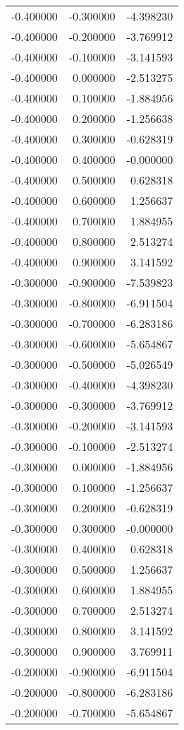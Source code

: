 \begin{tabular}{rrr}
-0.400000 & -0.300000 & -4.398230 \\
-0.400000 & -0.200000 & -3.769912 \\
-0.400000 & -0.100000 & -3.141593 \\
-0.400000 & 0.000000 & -2.513275 \\
-0.400000 & 0.100000 & -1.884956 \\
-0.400000 & 0.200000 & -1.256638 \\
-0.400000 & 0.300000 & -0.628319 \\
-0.400000 & 0.400000 & -0.000000 \\
-0.400000 & 0.500000 & 0.628318 \\
-0.400000 & 0.600000 & 1.256637 \\
-0.400000 & 0.700000 & 1.884955 \\
-0.400000 & 0.800000 & 2.513274 \\
-0.400000 & 0.900000 & 3.141592 \\
-0.300000 & -0.900000 & -7.539823 \\
-0.300000 & -0.800000 & -6.911504 \\
-0.300000 & -0.700000 & -6.283186 \\
-0.300000 & -0.600000 & -5.654867 \\
-0.300000 & -0.500000 & -5.026549 \\
-0.300000 & -0.400000 & -4.398230 \\
-0.300000 & -0.300000 & -3.769912 \\
-0.300000 & -0.200000 & -3.141593 \\
-0.300000 & -0.100000 & -2.513274 \\
-0.300000 & 0.000000 & -1.884956 \\
-0.300000 & 0.100000 & -1.256637 \\
-0.300000 & 0.200000 & -0.628319 \\
-0.300000 & 0.300000 & -0.000000 \\
-0.300000 & 0.400000 & 0.628318 \\
-0.300000 & 0.500000 & 1.256637 \\
-0.300000 & 0.600000 & 1.884955 \\
-0.300000 & 0.700000 & 2.513274 \\
-0.300000 & 0.800000 & 3.141592 \\
-0.300000 & 0.900000 & 3.769911 \\
-0.200000 & -0.900000 & -6.911504 \\
-0.200000 & -0.800000 & -6.283186 \\
-0.200000 & -0.700000 & -5.654867 \\

\end{tabular}
